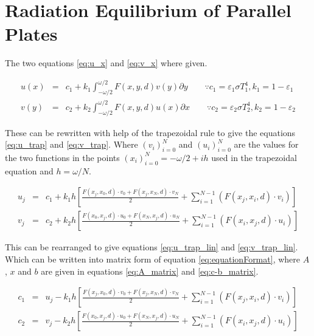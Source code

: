 \section{Radiation Equilibrium of Parallel Plates}
The two equations \ref{eq:u_x} and \ref{eq:v_x} where given.


\begin{eqnarray}
u(x) &=& c_1 + k_1 \int^{\omega/2}_{-\omega/2} F(x,y,d)v(y) \partial y \qquad \because c_1 = \varepsilon_1  \sigma T_1^4, k_1 = 1 - \varepsilon_1 \label{eq:u_x} \\
v(y) &=& c_2 + k_2 \int^{\omega/2}_{-\omega/2} F(x,y,d)u(x) \partial x \qquad \because c_2 = \varepsilon_2  \sigma T_2^4, k_2 = 1 - \varepsilon_2 \label{eq:v_x}
\end{eqnarray}

These can be rewritten with help of the trapezoidal rule to give the equations \ref{eq:u_trap} and \ref{eq:v_trap}.
Where $(v_i)_{i=0}^N$ and $(u_i)_{i=0}^N$ are the values for the two functions in the points $(x_i)_{i=0}^N = -\omega/2 + i h$ used in the trapezoidal equation and $h = \omega/N$.

\begin{eqnarray}
u_j &=& c_1 + k_1 h \left[ \frac{F(x_j, x_0, d) \cdot v_0 + F(x_j, x_N, d) \cdot v_N}{2} + \sum_{i = 1}^{N-1} \left( F(x_j, x_i, d) \cdot v_i \right) \right] \label{eq:u_trap}\\
v_j &=& c_2 + k_2 h \left[ \frac{F(x_0, x_j, d) \cdot u_0 + F(x_N, x_j, d) \cdot u_N}{2} + \sum_{i = 1}^{N-1} \left( F(x_i, x_j, d) \cdot u_i \right) \right] \label{eq:v_trap}
\end{eqnarray}

This can be rearranged to give equations \ref{eq:u_trap_lin} and \ref{eq:v_trap_lin}.
Which can be written into matrix form of equation \ref{eq:equationFormat}, where $A$, $x$ and $b$ are given in equations \ref{eq:A_matrix} and \ref{eq:c-b_matrix}.

\begin{eqnarray}
c_1 &=& u_j - k_1 h \left[ \frac{F(x_j, x_0, d) \cdot v_0 + F(x_j, x_N, d) \cdot v_N}{2} + \sum_{i = 1}^{N-1} \left( F(x_j, x_i, d) \cdot v_i \right) \right] \label{eq:u_trap_lin}\\
c_2 &=& v_j - k_2 h \left[ \frac{F(x_0, x_j, d) \cdot u_0 + F(x_N, x_j, d) \cdot u_N}{2} + \sum_{i = 1}^{N-1} \left( F(x_i, x_j, d) \cdot u_i \right) \right] \label{eq:v_trap_lin}
\end{eqnarray}


